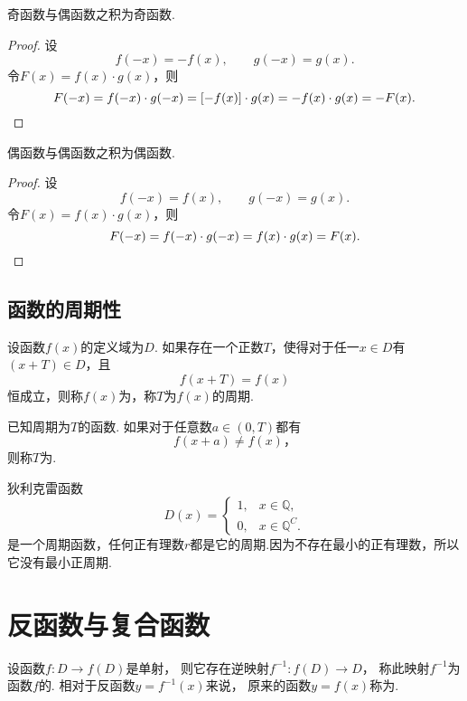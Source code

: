 \begin{property}
奇函数与偶函数之积为奇函数.
\begin{proof}
设\[
f(-x) = -f(x), \qquad g(-x) = g(x).
\]令\(F(x) = f(x) \cdot g(x)\)，则\[
F(-x) = f(-x) \cdot g(-x)
= [-f(x)] \cdot g(x)
= - f(x) \cdot g(x)
= - F(x).
\qedhere
\]
\end{proof}
\end{property}

\begin{property}
偶函数与偶函数之积为偶函数.
\begin{proof}
设\[
f(-x) = f(x), \qquad g(-x) = g(x).
\]令\(F(x) = f(x) \cdot g(x)\)，则\[
F(-x) = f(-x) \cdot g(-x) = f(x) \cdot g(x) = F(x).
\qedhere
\]
\end{proof}
\end{property}

\subsection{函数的周期性}
\begin{definition}
设函数\(f(x)\)的定义域为\(D\).
如果存在一个正数\(T\)，使得对于任一\(x \in D\)有\((x + T) \in D\)，且\[
f(x+ T) = f(x)
\]恒成立，则称\(f(x)\)为，称\(T\)为\(f(x)\)的周期.

已知周期为\(T\)的函数.
如果对于任意数\(a \in (0,T)\)都有\[
f(x + a) \neq f(x)，
\]则称\(T\)为.
\end{definition}

\begin{example}
狄利克雷函数\[
D(x) = \left\{ \begin{array}{ll}
1, & x \in \mathbb{Q}, \\
0, & x \in \mathbb{Q}^C.
\end{array} \right.
\]是一个周期函数，任何正有理数\(r\)都是它的周期.因为不存在最小的正有理数，所以它没有最小正周期.
\end{example}

\section{反函数与复合函数}
\begin{definition}
设函数\(f\colon D \to f(D)\)是单射，
则它存在逆映射\(f^{-1}: f(D) \to D\)，
称此映射\(f^{-1}\)为函数\(f\)的.
相对于反函数\(y=f^{-1}(x)\)来说，
原来的函数\(y=f(x)\)称为.
\end{definition}

